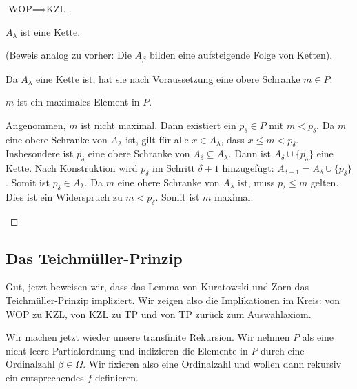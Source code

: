 \begin{proof}[$\text{WOP} \implies \text{KZL}$]
\begin{math-stroke}
\begin{claim}
$A_\lambda$ ist eine Kette.
\end{claim}
(Beweis analog zu vorher: Die $A_\beta$ bilden eine aufsteigende Folge von Ketten).

Da $A_\lambda$ eine Kette ist, hat sie nach Voraussetzung eine obere Schranke $m \in P$.

\begin{claim}
$m$ ist ein maximales Element in $P$.
\end{claim}
\begin{short-proof}
Angenommen, $m$ ist nicht maximal. Dann existiert ein $p_\delta \in P$ mit $m < p_\delta$.
Da $m$ eine obere Schranke von $A_\lambda$ ist, gilt für alle $x \in A_\lambda$, dass $x \le m < p_\delta$.
Insbesondere ist $p_\delta$ eine obere Schranke von $A_\delta \subseteq A_\lambda$.
Dann ist $A_\delta \cup \{p_\delta\}$ eine Kette.
Nach Konstruktion wird $p_\delta$ im Schritt $\delta+1$ hinzugefügt: $A_{\delta+1} = A_\delta \cup \{p_\delta\}$.
Somit ist $p_\delta \in A_\lambda$.
Da $m$ eine obere Schranke von $A_\lambda$ ist, muss $p_\delta \le m$ gelten.
Dies ist ein Widerspruch zu $m < p_\delta$.
Somit ist $m$ maximal.
\end{short-proof}
\end{math-stroke}
\end{proof}

\begin{ai-global-state-checkpoint-invisible-content}
\end{ai-global-state-checkpoint-invisible-content}

\subsection{Das Teichmüller-Prinzip}

\begin{spoken-clean}[00:56:45 - 00:58:30]
Gut, jetzt beweisen wir, dass das Lemma von Kuratowski und Zorn das Teichmüller-Prinzip impliziert. Wir zeigen also die Implikationen im Kreis: von WOP zu KZL, von KZL zu TP und von TP zurück zum Auswahlaxiom. 

Wir machen jetzt wieder unsere transfinite Rekursion. Wir nehmen $P$ als eine nicht-leere Partialordnung und indizieren die Elemente in $P$ durch eine Ordinalzahl $\beta \in \Omega$. Wir fixieren also eine Ordinalzahl und wollen dann rekursiv ein entsprechendes $f$ definieren.
\end{spoken-clean}

